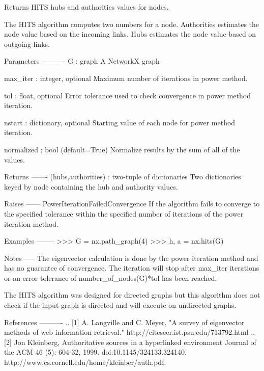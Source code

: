 \begin{DoxyVerb}Returns HITS hubs and authorities values for nodes.

The HITS algorithm computes two numbers for a node.
Authorities estimates the node value based on the incoming links.
Hubs estimates the node value based on outgoing links.

Parameters
----------
G : graph
  A NetworkX graph

max_iter : integer, optional
  Maximum number of iterations in power method.

tol : float, optional
  Error tolerance used to check convergence in power method iteration.

nstart : dictionary, optional
  Starting value of each node for power method iteration.

normalized : bool (default=True)
   Normalize results by the sum of all of the values.

Returns
-------
(hubs,authorities) : two-tuple of dictionaries
   Two dictionaries keyed by node containing the hub and authority
   values.

Raises
------
PowerIterationFailedConvergence
    If the algorithm fails to converge to the specified tolerance
    within the specified number of iterations of the power iteration
    method.

Examples
--------
>>> G = nx.path_graph(4)
>>> h, a = nx.hits(G)

Notes
-----
The eigenvector calculation is done by the power iteration method
and has no guarantee of convergence.  The iteration will stop
after max_iter iterations or an error tolerance of
number_of_nodes(G)*tol has been reached.

The HITS algorithm was designed for directed graphs but this
algorithm does not check if the input graph is directed and will
execute on undirected graphs.

References
----------
.. [1] A. Langville and C. Meyer,
   "A survey of eigenvector methods of web information retrieval."
   http://citeseer.ist.psu.edu/713792.html
.. [2] Jon Kleinberg,
   Authoritative sources in a hyperlinked environment
   Journal of the ACM 46 (5): 604-32, 1999.
   doi:10.1145/324133.324140.
   http://www.cs.cornell.edu/home/kleinber/auth.pdf.
\end{DoxyVerb}
 \mbox{\label{namespacenetworkx_1_1algorithms_1_1link__analysis_1_1hits__alg_a940e4ad55a082f2588ee5e9b23f2275b}} 
